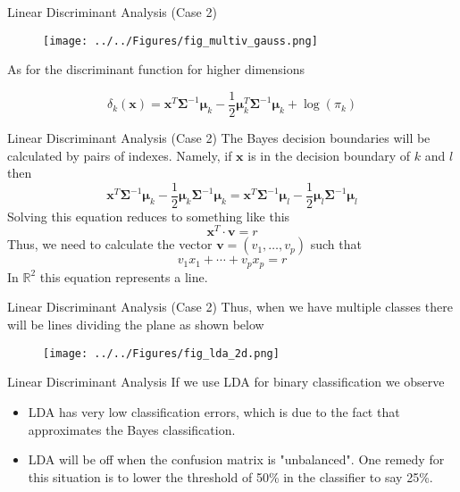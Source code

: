 \documentclass{beamer}
\begin{document}
\begin{frame}{Linear Discriminant Analysis (Case 2)}
	 \begin{figure}[h]
		\centering
		\texttt{[image: ../../Figures/fig\_multiv\_gauss.png]}
	\end{figure}
	
	
	As for the discriminant function for higher dimensions
	
	\begin{equation*}
		\delta_k(\bm{x})= \bm{x}^T \bm{\Sigma}^{-1} \bm{\mu}_k - \frac{1}{2} \bm{\mu}_k^T \bm{\Sigma}^{-1}\bm{\mu}_k + \log(\pi_k)
	\end{equation*}
\end{frame}

\begin{frame}{Linear Discriminant Analysis (Case 2)}
	The Bayes decision boundaries will be calculated by pairs of indexes. Namely, if $\bm{x}$ is in the decision boundary of $k$ and $l$ then
	\begin{equation*}
		\bm{x}^T \bm{\Sigma}^{-1} \bm{\mu}_k - \frac{1}{2} \bm{\mu}_k \bm{\Sigma}^{-1} \bm{\mu}_k= 	\bm{x}^T \bm{\Sigma}^{-1} \bm{\mu}_l - \frac{1}{2} \bm{\mu}_l \bm{\Sigma}^{-1} \bm{\mu}_l
	\end{equation*}
Solving this equation reduces to something like this
\begin{equation*}
	\bm{x}^T \cdot \bm{v}= r
\end{equation*}
Thus, we need to calculate the vector $\bm{v}=(v_1,\ldots,v_p)$ such that 
\begin{equation*}
	v_1 x_1 + \cdots + v_p x_p = r
\end{equation*} 
In $\mathbb{R}^2$ this equation represents a line. 
\end{frame}
\begin{frame}{Linear Discriminant Analysis (Case 2)}
	Thus, when we have multiple classes there will be lines dividing the plane as shown below
	\begin{figure}[h]
		\centering
		\texttt{[image: ../../Figures/fig\_lda\_2d.png]}
	\end{figure}
	
\end{frame}

\begin{frame}{Linear Discriminant Analysis}
	If we use LDA for binary classification we observe
	\begin{itemize}
		\item LDA has very low classification errors, which is due to the fact that approximates the Bayes classification.
		\item LDA will be off when the confusion matrix is "unbalanced". One remedy for this situation is to lower the threshold of 50\% in the classifier to say 25\%. 
	\end{itemize}
\end{frame}
\end{document}
